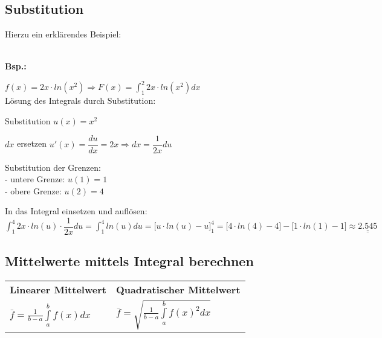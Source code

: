 \subsection{Substitution}
Hierzu ein erklärendes Beispiel:\\\\
\begin{minipage}[t]{1cm}
	\textbf{Bsp.:}
\end{minipage}
\begin{minipage}[t]{16cm}
	$\displaystyle f(x) = 2x \cdot ln(x^2) \Rightarrow F(x) = \int_{1}^{2} 2x \cdot ln(x^2) dx$\\
	Lösung des Integrals durch Substitution:
	\begin{compactenum}
		\item Substitution \qquad $\displaystyle u(x) = x^2$
		\item $dx$ ersetzen \qquad $\displaystyle u'(x) = \dfrac{du}{dx}=2x \Rightarrow dx = \dfrac{1}{2x}du$
		\item Substitution der Grenzen:\\
		- untere Grenze: \qquad $u(1) = 1$\\
		- obere Grenze: \qquad $u(2) = 4$
		\item In das Integral einsetzen und auflösen:\\
		$\displaystyle \int_{1}^{4} 2x \cdot ln(u) \cdot \dfrac{1}{2x}du = \int_{1}^{4} ln(u) du= \bigl[u \cdot ln(u)-u\bigr]_1^4 = \bigl[4 \cdot ln(4)-4\bigr] - \bigl[1 \cdot ln(1)-1\bigr] \approx \underline{\underline{2.545}}$
	\end{compactenum}
\end{minipage}

\subsection{Mittelwerte mittels Integral berechnen}
\begin{tabular}{ll}
	\textbf{Linearer Mittelwert} &
	\textbf{Quadratischer Mittelwert}\\
	$\bar{f} = \frac{1}{b-a} \int\limits_{a}^{b} f(x)dx$ &
	$\bar{f} = \sqrt{\frac{1}{b-a} \int\limits_{a}^{b} f(x)^2dx}$
\end{tabular}



